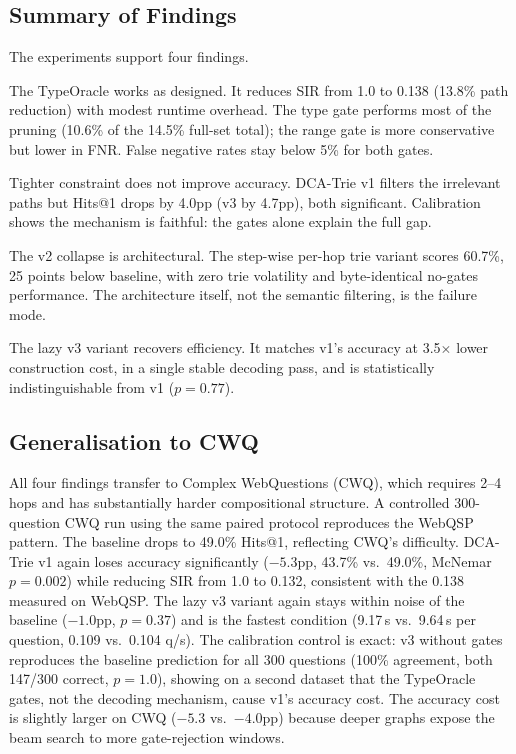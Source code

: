 \subsection{Summary of Findings}
\label{sec:results:summary}

The experiments support four findings.

The TypeOracle works as designed. It reduces SIR from 1.0 to 0.138 (13.8\% path
reduction) with modest runtime overhead. The type gate performs most of the pruning
(10.6\% of the 14.5\% full-set total); the range gate is more conservative but lower in
FNR. False negative rates stay below 5\% for both gates.

Tighter constraint does not improve accuracy. DCA-Trie v1 filters the irrelevant paths
but Hits@1 drops by 4.0pp (v3 by 4.7pp), both significant. Calibration shows the
mechanism is faithful: the gates alone explain the full gap.

The v2 collapse is architectural. The step-wise per-hop trie variant scores 60.7\%,
25 points below baseline, with zero trie volatility and byte-identical no-gates
performance. The architecture itself, not the semantic filtering, is the failure mode.

The lazy v3 variant recovers efficiency. It matches v1's accuracy at 3.5$\times$ lower
construction cost, in a single stable decoding pass, and is statistically
indistinguishable from v1 ($p = 0.77$).

\subsection{Generalisation to CWQ}
\label{sec:results:cwq}

All four findings transfer to Complex WebQuestions (CWQ), which requires 2--4 hops and
has substantially harder compositional structure. A controlled 300-question CWQ run
using the same paired protocol reproduces the WebQSP pattern. The baseline drops to
49.0\% Hits@1, reflecting CWQ's difficulty. DCA-Trie v1 again loses accuracy
significantly ($-5.3$pp, 43.7\% vs.\ 49.0\%, McNemar $p=0.002$) while reducing SIR from
1.0 to 0.132, consistent with the 0.138 measured on WebQSP. The lazy v3 variant again
stays within noise of the baseline ($-1.0$pp, $p=0.37$) and is the fastest condition
(9.17\,s vs.\ 9.64\,s per question, 0.109 vs.\ 0.104 q/s). The calibration control is
exact: v3 without gates reproduces the baseline prediction for all 300 questions
(100\% agreement, both 147/300 correct, $p=1.0$), showing on a second dataset that
the TypeOracle gates, not the decoding mechanism, cause v1's accuracy cost. The accuracy
cost is slightly larger on CWQ ($-5.3$ vs.\ $-4.0$pp) because deeper graphs expose the
beam search to more gate-rejection windows.